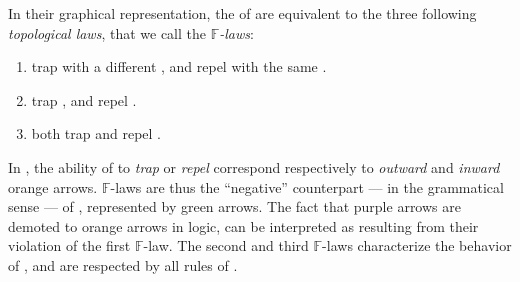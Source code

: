 \begin{description}
  In their graphical representation, the   of
   are equivalent to the three following \emph{topological laws},
  that we call the \emph{$\mathbb{F}$-laws}:
  \begin{fact}
    \sbr
    \begin{enumerate}
      \item {}  trap  with a different
      , and repel  with the same .
      \item {}  trap  , and repel
       .
      \item {}  both trap and repel  .
    \end{enumerate}
  \end{fact}
  In , the ability of  to \emph{trap} or
  \emph{repel}  correspond respectively to \emph{outward} and
  \emph{inward} orange arrows. $\mathbb{F}$-laws are thus the ``negative''
  counterpart --- in the grammatical sense --- of ,
  represented by green arrows. The fact that purple arrows are demoted to orange
  arrows in  logic, can be interpreted as resulting from
  their violation of the first $\mathbb{F}$-law. The second and third
  $\mathbb{F}$-laws characterize the behavior of  , and are
  respected by all rules of .
  

\end{description}
